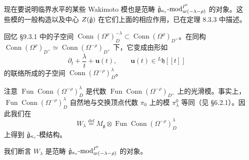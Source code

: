 现在要说明临界水平的某些 Wakimoto 模也是范畴 $\hat{\mathfrak{g}}_{\kappa_c}\text{-mod}^{I^0}_{\varpi(-\lambda-\rho)}$ 的对象。这些模的一般构造以及中心 $Z(\hat{\mathfrak{g}})$ 在它们上面的相应作用，已在定理 8.3.3 中描述。

回忆 §9.3.1 中的子空间 $\operatorname{Conn}(\Omega^\rho)^{-\lambda}_D\subset\operatorname{Conn}(\Omega^\rho)_{D^\times}$。在同构 $\operatorname{Conn}(\Omega^\rho)_{D^\times}\simeq\operatorname{Conn}(\Omega^{-\rho})_{D^\times}$ 下，它变成由形如
\begin{equation}
    \partial_t+\frac{\lambda}{t}+\mathbf{u}(t),\qquad \mathbf{u}(t)\in{}^L\mathfrak{h}[[t]]
    \tag{9.4-4}
\end{equation}
的联络所成的子空间 $\operatorname{Conn}(\Omega^{-\rho})^\lambda_D$。


注意 $\operatorname{Fun}\operatorname{Conn}(\Omega^{-\rho})^\lambda_D$ 是代数 $\operatorname{Fun}\operatorname{Conn}(\Omega^{-\rho})_{D^\times}$ 上的光滑模。事实上，$\operatorname{Fun}\operatorname{Conn}(\Omega^{-\rho})^\lambda_D$ 自然地与交换顶点代数 $\pi_0$ 上的模 $\pi^0_\lambda$ 等同（见 §6.2.1）。因此我们在
\begin{equation}
    W_\lambda\overset{\mathrm{def}}{=}M_{\mathfrak{g}}\otimes\operatorname{Fun}\operatorname{Conn}(\Omega^{-\rho})^\lambda_D
    \tag{9.4-5}
\end{equation}
上得到 $\hat{\mathfrak{g}}_{\kappa_c}$-模结构。

我们断言 $W_\lambda$ 是范畴 $\hat{\mathfrak{g}}_{\kappa_c}\text{-mod}^{I^0}_{\varpi(-\lambda-\rho)}$ 的对象。

